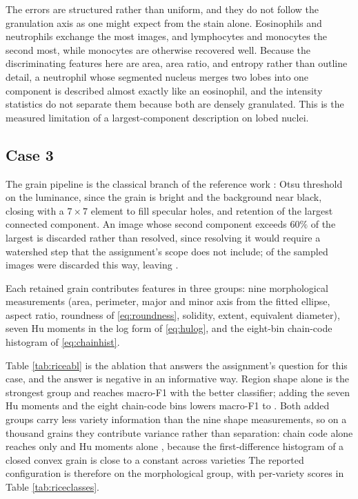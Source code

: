 \documentclass{ieeeaccess}
\begin{document}
\begin{table}[!t]
\centering
\caption{Case 2, per-subtype scores of the \wbcBest{} classifier under
five-fold stratified cross-validation.}
\label{tab:wbc}
\footnotesize

\end{table}

The errors are structured rather than uniform, and they do not follow the
granulation axis as one might expect from the stain alone. Eosinophils and
neutrophils exchange the most images, and lymphocytes and monocytes the second
most, while monocytes are otherwise recovered well. Because the discriminating
features here are area, area ratio, and entropy rather than outline detail, a
neutrophil whose segmented nucleus merges two lobes into one component is
described almost exactly like an eosinophil, and the intensity statistics do not
separate them because both are densely granulated. This is the measured
limitation of a largest-component description on lobed nuclei.

\subsection{Case 3}
\label{sec:case3}
The grain pipeline is the classical branch of the reference work
\cite{cinar2019}: Otsu threshold on the luminance, since the grain is bright and
the background near black, closing with a $7\times7$ element to fill specular
holes, and retention of the largest connected component. An image whose second
component exceeds $60\%$ of the largest is discarded rather than resolved, since
resolving it would require a watershed step that the assignment's scope does not
include; \riceDropped{} of the sampled images were discarded this way, leaving
\riceImages{}.

Each retained grain contributes \riceFeatures{} features in three groups: nine
morphological measurements (area, perimeter, major and minor axis from the fitted
ellipse, aspect ratio, roundness of \eqref{eq:roundness}, solidity, extent,
equivalent diameter), seven Hu moments in the log form of \eqref{eq:hulog}, and
the eight-bin chain-code histogram of \eqref{eq:chainhist}.

Table \ref{tab:riceabl} is the ablation that answers the assignment's question
for this case, and the answer is negative in an informative way. Region shape
alone is the strongest group and reaches macro-F1 \riceMorphOne{} with the
better classifier; adding the seven Hu moments and the eight chain-code bins
lowers macro-F1 to \riceAllOne{}. Both added groups carry less variety
information than the nine shape measurements, so on a thousand grains they
contribute variance rather than separation: chain code alone reaches only
\riceChainOne{} and Hu moments alone \riceHuOne{}, because the first-difference histogram of a closed convex grain
is close to a constant across varieties The
reported configuration is therefore \riceBest{} on the morphological group,
with per-variety scores in Table \ref{tab:riceclasses}.
\end{document}
